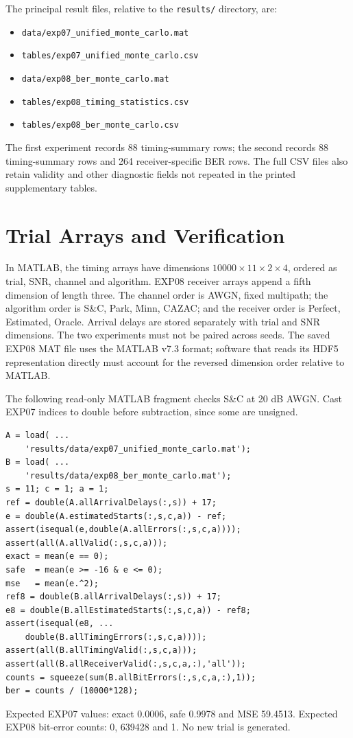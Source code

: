 The principal result files, relative to the \texttt{results/} directory, are:
\begin{itemize}
\item \verb|data/exp07_unified_monte_carlo.mat|
\item \verb|tables/exp07_unified_monte_carlo.csv|
\item \verb|data/exp08_ber_monte_carlo.mat|
\item \verb|tables/exp08_timing_statistics.csv|
\item \verb|tables/exp08_ber_monte_carlo.csv|
\end{itemize}
The first experiment records 88 timing-summary rows; the second records 88
timing-summary rows and 264 receiver-specific BER rows. The full CSV files
also retain validity and other diagnostic fields not repeated in the printed
supplementary tables.

\section{Trial Arrays and Verification}
In MATLAB, the timing arrays have dimensions $10000\times11\times2\times4$,
ordered as trial, SNR, channel and algorithm. EXP08 receiver arrays append a
fifth dimension of length three. The channel order is AWGN, fixed multipath;
the algorithm order is S\&C, Park, Minn, CAZAC; and the receiver order is
Perfect, Estimated, Oracle. Arrival delays are stored separately with
trial and SNR dimensions. The two experiments must not be paired across
seeds. The saved EXP08 MAT file uses the MATLAB v7.3 format; software that
reads its HDF5 representation directly must account for the reversed dimension
order relative to MATLAB.

The following read-only MATLAB fragment checks S\&C at 20 dB AWGN.
Cast EXP07 indices to double before subtraction, since some are unsigned.
\begin{small}
\begin{verbatim}
A = load( ...
    'results/data/exp07_unified_monte_carlo.mat');
B = load( ...
    'results/data/exp08_ber_monte_carlo.mat');
s = 11; c = 1; a = 1;
ref = double(A.allArrivalDelays(:,s)) + 17;
e = double(A.estimatedStarts(:,s,c,a)) - ref;
assert(isequal(e,double(A.allErrors(:,s,c,a))));
assert(all(A.allValid(:,s,c,a)));
exact = mean(e == 0);
safe  = mean(e >= -16 & e <= 0);
mse   = mean(e.^2);
ref8 = double(B.allArrivalDelays(:,s)) + 17;
e8 = double(B.allEstimatedStarts(:,s,c,a)) - ref8;
assert(isequal(e8, ...
    double(B.allTimingErrors(:,s,c,a))));
assert(all(B.allTimingValid(:,s,c,a)));
assert(all(B.allReceiverValid(:,s,c,a,:),'all'));
counts = squeeze(sum(B.allBitErrors(:,s,c,a,:),1));
ber = counts / (10000*128);
\end{verbatim}
\end{small}
Expected EXP07 values: exact 0.0006, safe 0.9978 and MSE 59.4513.
Expected EXP08 bit-error counts: 0, 639428 and 1. No new trial is generated.

